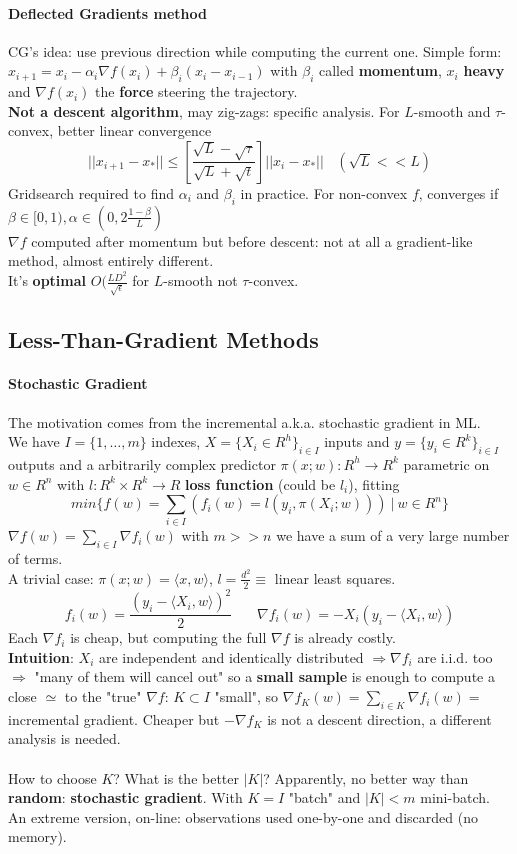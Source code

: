 \documentclass[10pt]{report}
\begin{document}
\paragraph{Deflected Gradients method} CG's idea: use previous direction while computing the current one. Simple form: $x_{i+1} = x_i - \alpha_i\nabla f(x_i) + \beta_i(x_i-x_{i-1})$ with $\beta_i$ called \textbf{momentum}, $x_i$ \textbf{heavy} and $\nabla f(x_i)$ the \textbf{force} steering the trajectory.\\
\textbf{Not a descent algorithm}, may zig-zags: specific analysis. For $L$-smooth and $\tau$-convex, better linear convergence
$$||x_{i+1} - x_*||\leq\left[\frac{\sqrt{L} - \sqrt{\tau}}{\sqrt{L} + \sqrt{t}}\right]||x_i-x_*||\:\:\:\:(\sqrt{L}<<L)$$
Gridsearch required to find $\alpha_i$ and $\beta_i$ in practice. For non-convex $f$, converges if $\beta\in[0,1), \alpha\in(0,2\frac{1-\beta}{L})$\\
$\nabla f$ computed after momentum but before descent: not at all a gradient-like method, almost entirely different.\\
It's \textbf{optimal} $O(\frac{LD^2}{\sqrt{\epsilon}}$ for $L$-smooth not $\tau$-convex.
\subsection{Less-Than-Gradient Methods}
\paragraph{Stochastic Gradient} The motivation comes from the incremental a.k.a. stochastic gradient in ML.\\
We have $I=\{1,\ldots,m\}$ indexes, $X=\{X_i\in R^h\}_{i\in I}$ inputs and $y=\{y_i\in R^k\}_{i\in I}$ outputs and a arbitrarily complex predictor $\pi(x;w):R^h\rightarrow R^k$ parametric on $w\in R^n$ with $l:R^k\times R^k \rightarrow R$ \textbf{loss function} (could be $l_i$), fitting $$min\{f(w) = \sum_{i\in I}\left(f_i(w) = l(y_i, \pi(X_i;w)) \right)\:|\:w\in R^n\}$$
$\nabla f(w) = \sum_{i\in I}\nabla f_i(w)$ with $m >> n$ we have a sum of a very large number of terms.\\
A trivial case: $\pi(x;w) = \langle x,w\rangle$, $l=\frac{d^2}{2}\equiv$ linear least squares.$$f_i(w) = \frac{(y_i-\langle X_i, w\rangle)^2}{2}\:\:\:\:\:\:\:\:\nabla f_i(w) = -X_i(y_i - \langle X_i, w\rangle)$$
Each $\nabla f_i$ is cheap, but computing the full $\nabla f$ is already costly.\\
\textbf{Intuition}: $X_i$ are independent and identically distributed $\Rightarrow\nabla f_i$ are i.i.d. too $\Rightarrow$ "many of them will cancel out" so a \textbf{small sample} is enough to compute a close $\simeq$ to the "true" $\nabla f$: $K\subset I$ "small", so $\nabla f_K(w) = \sum_{i\in K}\nabla f_i(w) =$ incremental gradient. Cheaper but $-\nabla f_K$ is not a descent direction, a different analysis is needed.\\\\
How to choose $K$? What is the better $|K|$? Apparently, no better way than \textbf{random}: \textbf{stochastic gradient}. With $K=I$ "batch" and $|K|<m$ mini-batch. An extreme version, on-line: observations used one-by-one and discarded (no memory).
\end{document}
